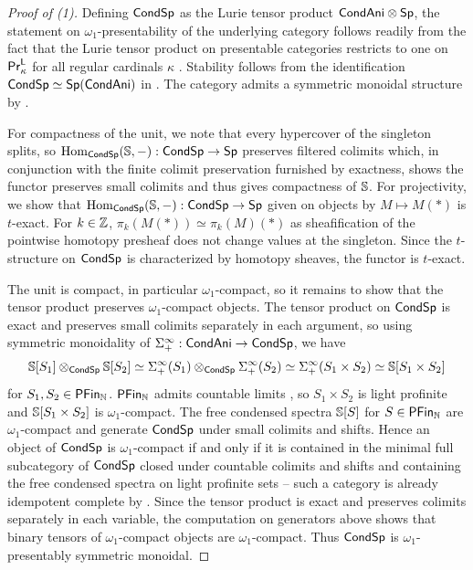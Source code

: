 \begin{proof}[Proof of (1)]
    Defining $\mathsf{Cond}\mathsf{Sp}$ as the Lurie tensor product $\mathsf{Cond}\mathsf{Ani}\otimes\mathsf{Sp}$, the statement on $\omega_{1}$-presentability of the underlying category follows readily from the fact that the Lurie tensor product on presentable categories restricts to one on $\mathsf{Pr}^{\mathsf{L}}_{\kappa}$ for all regular cardinals $\kappa$ \cite[Lem. 5.3.2.11]{HA}. Stability follows from the identification $\mathsf{Cond}\mathsf{Sp}\simeq\mathsf{Sp}(\mathsf{Cond}\mathsf{Ani})$ in . The category admits a symmetric monoidal structure by \cite[\S 1.3.4]{SAG}.
    
    For compactness of the unit, we note that every hypercover of the singleton splits, so $\mathrm{Hom}_{\mathsf{Cond}\mathsf{Sp}}(\mathbb{S},-):\mathsf{Cond}\mathsf{Sp}\to\mathsf{Sp}$ preserves filtered colimits which, in conjunction with the finite colimit preservation furnished by exactness, shows the functor preserves small colimits and thus gives compactness of $\mathbb{S}$. For projectivity, we show that $\mathrm{Hom}_{\mathsf{Cond}\mathsf{Sp}}(\mathbb{S},-):\mathsf{Cond}\mathsf{Sp}\to\mathsf{Sp}$ given on objects by $M\mapsto M(*)$ is $t$-exact. For $k\in\mathbb{Z}$, $\pi_{k}(M(*))\simeq\pi_{k}(M)(*)$ as sheafification of the pointwise homotopy presheaf does not change values at the singleton. Since the $t$-structure on $\mathsf{Cond}\mathsf{Sp}$ is characterized by homotopy sheaves, the functor is $t$-exact. 

    The unit is compact, in particular $\omega_{1}$-compact, so it remains to show that the tensor product preserves $\omega_{1}$-compact objects. The tensor product on $\mathsf{Cond}\mathsf{Sp}$ is exact and preserves small colimits separately in each argument, so using symmetric monoidality of $\Sigma^{\infty}_{+}:\mathsf{Cond}\mathsf{Ani}\to\mathsf{Cond}\mathsf{Sp}$, we have
    $$\mathbb{S}[S_{1}]\otimes_{\mathsf{Cond}\mathsf{Sp}}\mathbb{S}[S_{2}]\simeq\Sigma^{\infty}_{+}(S_{1})\otimes_{\mathsf{Cond}\mathsf{Sp}}\Sigma^{\infty}_{+}(S_{2})\simeq\Sigma^{\infty}_{+}(S_{1}\times S_{2})\simeq\mathbb{S}[S_{1}\times S_{2}]$$
    for $S_{1},S_{2}\in\mathsf{PFin}_{\mathbb{N}}$. $\mathsf{PFin}_{\mathbb{N}}$ admits countable limits \cite[Prop. 2.1.4]{CamargoSolid}, so $S_{1}\times S_{2}$ is light profinite and $\mathbb{S}[S_{1}\times S_{2}]$ is $\omega_{1}$-compact. The free condensed spectra $\mathbb{S}[S]$ for $S\in\mathsf{PFin}_{\mathbb{N}}$ are $\omega_{1}$-compact and generate $\mathsf{Cond}\mathsf{Sp}$ under small colimits and shifts. Hence an object of $\mathsf{Cond}\mathsf{Sp}$ is $\omega_{1}$-compact if and only if it is contained in the minimal full subcategory of $\mathsf{Cond}\mathsf{Sp}$ closed under countable colimits and shifts and containing the free condensed spectra on light profinite sets -- such a category is already idempotent complete by \cite[Cor. 4.4.5.15]{HTT}. Since the tensor product is exact and preserves colimits separately in each variable, the computation on generators above shows that binary tensors of $\omega_{1}$-compact objects are $\omega_{1}$-compact. Thus $\mathsf{Cond}\mathsf{Sp}$ is $\omega_{1}$-presentably symmetric monoidal. 
\end{proof}
